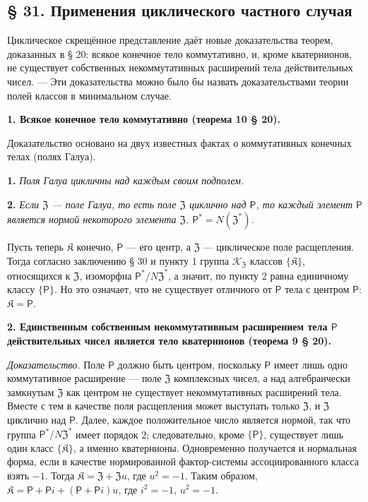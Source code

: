 \documentclass[11pt]{article}
\begin{document}
\subsection*{§ 31. Применения циклического частного случая}\label{anwendungen-des-zyklischen-spezialfalles}

Циклическое скрещённое представление даёт новые доказательства теорем, доказанных в § 20: всякое конечное тело коммутативно, и, кроме кватернионов, не существует собственных некоммутативных расширений тела действительных чисел. --- Эти доказательства можно было бы назвать доказательствами теории полей классов в минимальном случае.

\noindent\textbf{1. Всякое конечное тело коммутативно (теорема 10 § 20).}

Доказательство основано на двух известных фактах о коммутативных конечных телах (полях Галуа).

\noindent\textbf{1.} \emph{Поля Галуа цикличны над каждым своим подполем.}

\noindent\textbf{2.} \emph{Если \(\mathfrak Z\) --- поле Галуа, то есть поле \(\mathfrak Z\) циклично над \(\mathsf{P}\), то каждый элемент \(\mathsf{P}\) является нормой некоторого элемента \(\mathfrak Z\). \(\mathsf{P}^*=N(\mathfrak Z^*)\).}

Пусть теперь \(\mathfrak K\) конечно, \(\mathsf{P}\) --- его центр, а \(\mathfrak Z\) --- циклическое поле расщепления. Тогда согласно заключению § 30 и пункту 1 группа \(\mathscr K_{\mathfrak Z}\) классов \(\{\mathfrak K\}\), относящихся к \(\mathfrak Z\), изоморфна \(\mathsf{P}^*/N\mathfrak Z^*\), а значит, по пункту 2 равна единичному классу \(\{\mathsf{P}\}\). Но это означает, что не существует отличного от \(\mathsf{P}\) тела с центром \(\mathsf{P}\): \(\mathfrak K=\mathsf{P}\).

\noindent\textbf{2. Единственным собственным некоммутативным расширением тела \(\mathsf{P}\) действительных чисел является тело кватернионов (теорема 9 § 20).}

\noindent\emph{Доказательство.} Поле \(\mathsf{P}\) должно быть центром, поскольку \(\mathsf{P}\) имеет лишь одно коммутативное расширение --- поле \(\mathfrak Z\) комплексных чисел, а над алгебраически замкнутым \(\mathfrak Z\) как центром не существует некоммутативных расширений тела. Вместе с тем в качестве поля расщепления может выступать только \(\mathfrak Z\), и \(\mathfrak Z\) циклично над \(\mathsf{P}\). Далее, каждое положительное число является нормой, так что группа \(\mathsf{P}^*/N\mathfrak Z^*\) имеет порядок 2; следовательно, кроме \(\{\mathsf{P}\}\), существует лишь один класс \(\{\mathfrak K\}\), а именно кватернионы. Одновременно получается и нормальная форма, если в качестве нормированной фактор-системы ассоциированного класса взять \(-1\). Тогда \(\mathfrak K=\mathfrak Z+\mathfrak Zu\), где \(u^2=-1\). Таким образом, \(\mathfrak K=\mathsf P+\mathsf Pi+(\mathsf P+\mathsf Pi)u\), где \(i^2=-1\), \(u^2=-1\).
\end{document}
